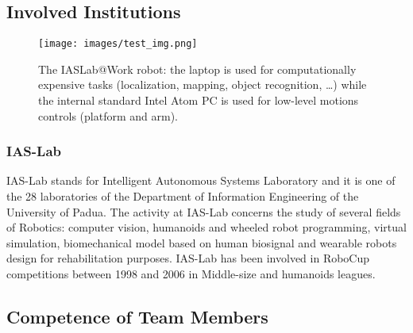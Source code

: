 \documentclass[conference]{IEEEtran}
\begin{document}
\subsection{Involved Institutions}
\begin{figure}[t!]
\begin{center}
\texttt{[image: images/test\_img.png]}
\end{center}
\caption{The IASLab@Work robot: the laptop is used for computationally expensive tasks (localization, mapping, object recognition, \dots) while the internal standard Intel Atom PC is used for low-level motions controls (platform and arm).}\label{fig:robot}
\end{figure}


\subsubsection{IAS-Lab} IAS-Lab stands for Intelligent Autonomous Systems Laboratory and it is one of the 28 laboratories of the Department of Information Engineering of the University of Padua.
The activity at IAS-Lab concerns the study of several fields of Robotics: computer vision, humanoids and wheeled robot programming, virtual simulation, biomechanical model based on human biosignal and wearable robots design for rehabilitation purposes. IAS-Lab has been involved in RoboCup competitions between 1998 and 2006 in Middle-size and humanoids leagues.\\

\subsection{Competence of Team Members}
\end{document}
